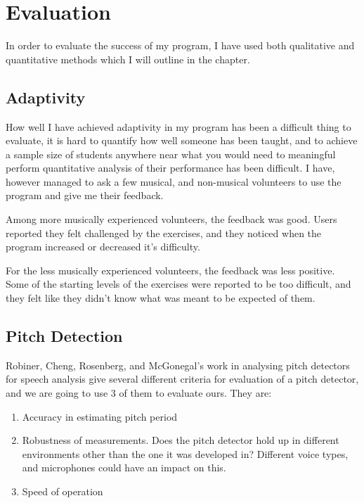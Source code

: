 \chapter{Evaluation}

In order to evaluate the success of my program, I have used both qualitative and quantitative methods which I will outline in the chapter.

\section{Adaptivity}
How well I have achieved adaptivity in my program has been a difficult thing to evaluate, it is hard to quantify how well someone has been taught, and to achieve a sample size of students anywhere near what you would need to meaningful perform quantitative analysis of their performance has been difficult. I have, however managed to ask a few musical, and non-musical volunteers to use the program and give me their feedback.

Among more musically experienced volunteers, the feedback was good. Users reported they felt challenged by the exercises, and they noticed when the program increased or decreased it's difficulty.

For the less musically experienced volunteers, the feedback was less positive. Some of the starting levels of the exercises were reported to be too difficult, and they felt like they didn't know what was meant to be expected of them.

\section{Pitch Detection}

Robiner, Cheng, Rosenberg, and McGonegal's work in analysing pitch detectors for speech analysis give several different criteria for evaluation of a pitch detector\cite{comparativePitchDetection}, and we are going to use 3 of them to evaluate ours. They are:
	\begin{enumerate}
		\item Accuracy in estimating pitch period
		\item Robustness of measurements. Does the pitch detector hold up in different environments other than the one it was developed in? Different voice types, and microphones could have an impact on this.
		\item Speed of operation


	\end{enumerate}
	
